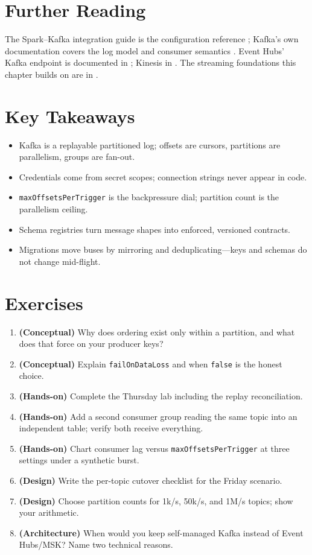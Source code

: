 \section{Further Reading}
The Spark--Kafka integration guide is the configuration reference \cite{sparkKafkaIntegration}; Kafka's own documentation covers the log model and consumer semantics \cite{kafkaDocs}. Event Hubs' Kafka endpoint is documented in \cite{eventHubsKafka}; Kinesis in \cite{kinesisDocs}. The streaming foundations this chapter builds on are in \cite{sparkStructuredStreaming}.

\section*{Key Takeaways}
\begin{itemize}
    \item Kafka is a replayable partitioned log; offsets are cursors, partitions are parallelism, groups are fan-out.
    \item Credentials come from secret scopes; connection strings never appear in code.
    \item \texttt{maxOffsetsPerTrigger} is the backpressure dial; partition count is the parallelism ceiling.
    \item Schema registries turn message shapes into enforced, versioned contracts.
    \item Migrations move buses by mirroring and deduplicating---keys and schemas do not change mid-flight.
\end{itemize}

\section{Exercises}
\begin{enumerate}
    \item \textbf{(Conceptual)} Why does ordering exist only within a partition, and what does that force on your producer keys?
    \item \textbf{(Conceptual)} Explain \texttt{failOnDataLoss} and when \texttt{false} is the honest choice.
    \item \textbf{(Hands-on)} Complete the Thursday lab including the replay reconciliation.
    \item \textbf{(Hands-on)} Add a second consumer group reading the same topic into an independent table; verify both receive everything.
    \item \textbf{(Hands-on)} Chart consumer lag versus \texttt{maxOffsetsPerTrigger} at three settings under a synthetic burst.
    \item \textbf{(Design)} Write the per-topic cutover checklist for the Friday scenario.
    \item \textbf{(Design)} Choose partition counts for 1k/s, 50k/s, and 1M/s topics; show your arithmetic.
    \item \textbf{(Architecture)} When would you keep self-managed Kafka instead of Event Hubs/MSK? Name two technical reasons.
\end{enumerate}
